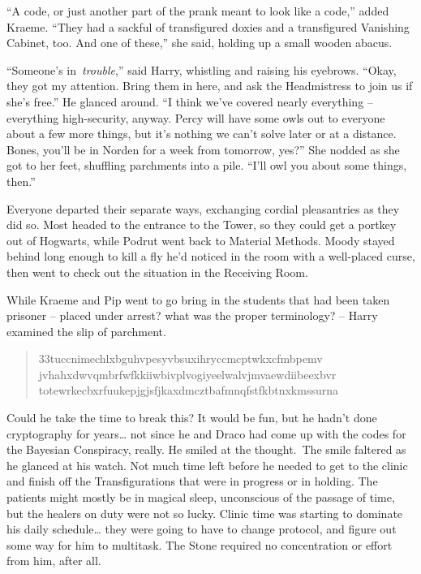 ``A code, or just another part of the prank meant to look like a code,''
added Kraeme. ``They had a sackful of transfigured doxies and a
transfigured Vanishing Cabinet, too. And one of these,'' she said,
holding up a small wooden abacus.

``Someone's in~\emph{trouble},'' said Harry, whistling and raising his
eyebrows. ``Okay, they got my attention. Bring them in here, and ask the
Headmistress to join us if she's free.'' He glanced around. ``I think
we've covered nearly everything -- everything high-security, anyway.
Percy will have some owls out to everyone about a few more things, but
it's nothing we can't solve later or at a distance. Bones, you'll be in
Norden for a week from tomorrow, yes?'' She nodded as she got to her
feet, shuffling parchments into a pile. ``I'll owl you about some
things, then.''

Everyone departed their separate ways, exchanging cordial pleasantries
as they did so. Most headed to the entrance to the Tower, so they could
get a portkey out of Hogwarts, while Podrut went back to Material
Methods. Moody stayed behind long enough to kill a fly he'd noticed in
the room with a well-placed curse, then went to check out the situation
in the Receiving Room.

While Kraeme and Pip went to go bring in the students that had been
taken prisoner -- placed under arrest? what was the proper terminology?
-- Harry examined the slip of parchment.\\

\begin{quote}
\noindent 33tuccnimechlxbguhvpesyvbsuxihryccmcptwkxcfmbpemv
jvhahxdwvqmbrfwfkkiiwbivplvogiyeelwalvjmvaewdiibeexbvr
totewrkecbxrfuukepjgjsfjkaxdmcztbafmnqfstfkbtnxkmssurna
\end{quote}

Could he take the time to break this? It would be fun, but he hadn't
done cryptography for years\ldots{} not since he and Draco had come up
with the codes for the Bayesian Conspiracy, really. He smiled at the
thought.~The smile faltered as he glanced at his watch. Not much time
left before he needed to get to the clinic and finish off the
Transfigurations that were in progress or in holding. The patients might
mostly be in magical sleep, unconscious of the passage of time, but the
healers on duty were not so lucky. Clinic time was starting to dominate
his daily schedule\ldots{} they were going to have to change protocol,
and figure out some way for him to multitask. The Stone required no
concentration or effort from him, after all.

